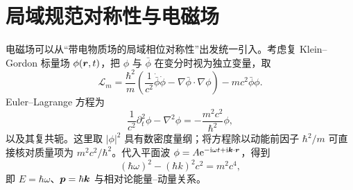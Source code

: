 \section{局域规范对称性与电磁场}

电磁场可以从“带电物质场的局域相位对称性”出发统一引入。考虑复 Klein--Gordon 标量场 $\phi(\bm{r},t)$，把 $\phi$ 与 $\bar\phi$ 在变分时视为独立变量，取
\[
 \mathcal L_m=\frac{\hbar^2}{m}
 \left(\frac1{c^2}\dot{\bar\phi}\dot\phi-
 \nabla\bar\phi\cdot\nabla\phi\right)-mc^2\bar\phi\phi.
\]
Euler--Lagrange 方程为
\[
 \frac1{c^2}\partial_t^2\phi-\nabla^2\phi
 =-\frac{m^2c^2}{\hbar^2}\phi,
\]
以及其复共轭。这里取 $|\phi|^2$ 具有数密度量纲；将方程除以动能前因子 $\hbar^2/m$ 可直接核对质量项为 $m^2c^2/\hbar^2$。代入平面波
$\phi=A\mathrm e^{-\mathrm i\omega t+\mathrm i\bm{k}\cdot\bm{r}}$，得到
\[
 (\hbar\omega)^2-(\hbar k)^2c^2=m^2c^4,
 \]
即 $E=\hbar\omega$、$\bm{p}=\hbar\bm{k}$ 与相对论能量--动量关系。

